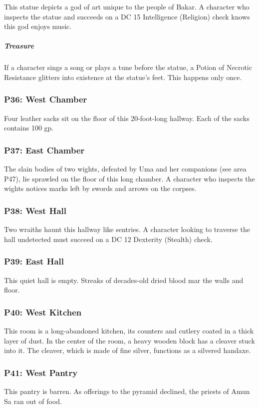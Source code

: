 \documentclass[10pt,a4paper,twoside,bg=print,twocolumn,openany,nodeprecatedcode]{dndbook}
\begin{document}
This statue depicts a god of art unique to the people of Bakar. A character who inspects the statue and succeeds on a DC 15 Intelligence (Religion) check knows this god enjoys music.

\subparagraph{Treasure}
If a character sings a song or plays a tune before the statue, a Potion of Necrotic Resistance glitters into existence at the statue's feet. This happens only once.

\subsubsection{P36: West Chamber}
Four leather sacks sit on the floor of this 20-foot-long hallway. Each of the sacks contains 100 gp.

\subsubsection{P37: East Chamber}
The slain bodies of two wights, defeated by Uma and her companions (see area P47), lie sprawled on the floor of this long chamber. A character who inspects the wights notices marks left by swords and arrows on the corpses.

\subsubsection{P38: West Hall}
Two wraiths haunt this hallway like sentries. A character looking to traverse the hall undetected must succeed on a DC 12 Dexterity (Stealth) check.

\subsubsection{P39: East Hall}
This quiet hall is empty. Streaks of decades-old dried blood mar the walls and floor.

\subsubsection{P40: West Kitchen}
This room is a long-abandoned kitchen, its counters and cutlery coated in a thick layer of dust. In the center of the room, a heavy wooden block has a cleaver stuck into it. The cleaver, which is made of fine silver, functions as a silvered handaxe.

\subsubsection{P41: West Pantry}
This pantry is barren. As offerings to the pyramid declined, the priests of Amun Sa ran out of food.
\end{document}
